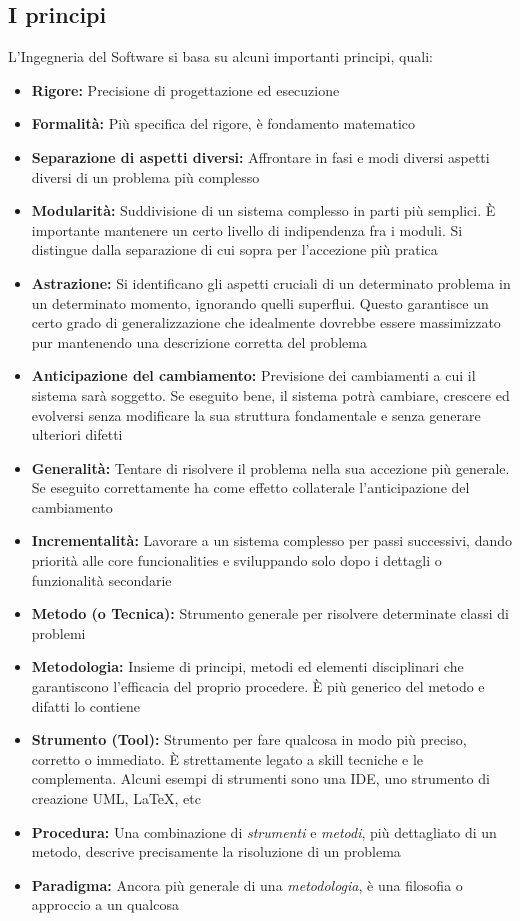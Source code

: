 \subsection{I principi}
    L'Ingegneria del Software si basa su alcuni importanti principi, quali:
    \begin{itemize}
        \item \textbf{Rigore:} Precisione di progettazione ed esecuzione
        \item \textbf{Formalità:} Più specifica del rigore, è fondamento matematico
        \item \textbf{Separazione di aspetti diversi:} Affrontare in fasi e modi diversi aspetti diversi di un problema più complesso
        \item \textbf{Modularità:} Suddivisione di un sistema complesso in parti più semplici. È importante mantenere un certo livello di indipendenza fra i moduli. Si distingue dalla separazione di cui sopra per l'accezione più pratica
        \item \textbf{Astrazione:} Si identificano gli aspetti cruciali di un determinato problema in un determinato momento, ignorando quelli superflui. Questo garantisce un certo grado di generalizzazione che idealmente dovrebbe essere massimizzato pur mantenendo una descrizione corretta del problema
        \item \textbf{Anticipazione del cambiamento:} Previsione dei cambiamenti a cui il sistema sarà soggetto. Se eseguito bene, il sistema potrà cambiare, crescere ed evolversi senza modificare la sua struttura fondamentale e senza generare ulteriori difetti
        \item \textbf{Generalità:} Tentare di risolvere il problema nella sua accezione più generale. Se eseguito correttamente ha come effetto collaterale l'anticipazione del cambiamento
        \item \textbf{Incrementalità:} Lavorare a un sistema complesso per passi successivi, dando priorità alle core funcionalities e sviluppando solo dopo i dettagli o funzionalità secondarie
        \item \textbf{Metodo (o Tecnica):} Strumento generale per risolvere determinate classi di problemi
        \item \textbf{Metodologia:} Insieme di principi, metodi ed elementi disciplinari che garantiscono l'efficacia del proprio procedere. È più generico del metodo e difatti lo contiene
        \item \textbf{Strumento (Tool):} Strumento per fare qualcosa in modo più preciso, corretto o immediato. È strettamente legato a skill tecniche e le complementa. Alcuni esempi di strumenti sono una IDE, uno strumento di creazione UML, \LaTeX, etc
        \item \textbf{Procedura:} Una combinazione di \textit{strumenti} e \textit{metodi}, più dettagliato di un metodo, descrive precisamente la risoluzione di un problema
        \item \textbf{Paradigma:} Ancora più generale di una \textit{metodologia}, è una filosofia o approccio a un qualcosa
    \end{itemize}
        
